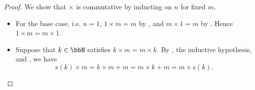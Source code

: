 \begin{proof}
        We show that $\times$ is commutative by inducting on $n$ for fixed $m$.

        \begin{itemize}
            \item For the base case, i.e. $n = 1$, $1 \times m = m$ by , and $m \times 1 = m$ by . Hence $1 \times m = m \times 1$.

            \item Suppose that $k \in \bbN$ satisfies $k \times m = m \times k$. By , the inductive hypothesis, and , we have
            $$s(k) \times m = k \times m + m = m \times k + m = m \times s(k).$$
        \end{itemize}

\end{proof}
